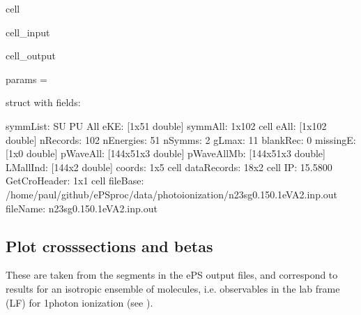 \documentclass[letterpaper,10pt,english]{jupyterBook}
\begin{document}
\begin{sphinxuseclass}{cell}\begin{sphinxVerbatimInput}

\begin{sphinxuseclass}{cell_input}
\begin{sphinxVerbatim}[commandchars=\\\{\}]
\end{sphinxVerbatim}

\end{sphinxuseclass}\end{sphinxVerbatimInput}
\begin{sphinxVerbatimOutput}

\begin{sphinxuseclass}{cell_output}
\begin{sphinxVerbatim}[commandchars=\\\{\}]
params = 

  struct with fields:

        symmList: \PYGZob{}\PYGZsq{}SU\PYGZsq{}  \PYGZsq{}PU\PYGZsq{}  \PYGZsq{}All\PYGZsq{}\PYGZcb{}
             eKE: [1x51 double]
         symmAll: \PYGZob{}1x102 cell\PYGZcb{}
            eAll: [1x102 double]
        nRecords: 102
       nEnergies: 51
          nSymms: 2
           gLmax: 11
        blankRec: 0
        missingE: [1x0 double]
        pWaveAll: [144x51x3 double]
      pWaveAllMb: [144x51x3 double]
        LMallInd: [144x2 double]
          coords: \PYGZob{}1x5 cell\PYGZcb{}
     dataRecords: \PYGZob{}18x2 cell\PYGZcb{}
              IP: 15.5800
    GetCroHeader: \PYGZob{}\PYGZob{}1x1 cell\PYGZcb{}\PYGZcb{}
        fileBase: \PYGZsq{}/home/paul/github/ePSproc/data/photoionization/n2\PYGZus{}3sg\PYGZus{}0.1\PYGZhy{}50.1eV\PYGZus{}A2.inp.out\PYGZsq{}
        fileName: \PYGZsq{}n2\PYGZus{}3sg\PYGZus{}0.1\PYGZhy{}50.1eV\PYGZus{}A2.inp.out\PYGZsq{}
\end{sphinxVerbatim}

\end{sphinxuseclass}\end{sphinxVerbatimOutput}

\end{sphinxuseclass}

\subsection{Plot cross\sphinxhyphen{}sections and betas}
\label{\detokenize{testChpt/ePSproc_Matlab_demo_notebook_090821:plot-cross-sections-and-betas}}
\sphinxAtStartPar
These are taken from the  segments in the ePS output files, and correspond to results for an isotropic ensemble of molecules, i.e. observables in the lab frame (LF) for 1\sphinxhyphen{}photon ionization (see ).
\end{document}
